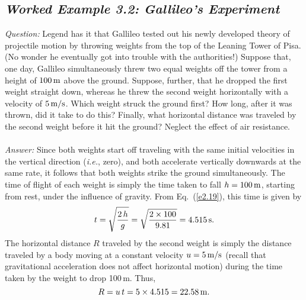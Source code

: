 \subsection*{\em Worked Example 3.2: Gallileo's Experiment}
{\em Question:} Legend has it that Gallileo tested out his newly developed
theory of projectile motion by throwing weights from the top of the
Leaning Tower of
Pisa. (No wonder he eventually got into trouble with the authorities!)
Suppose that, one day, Gallileo simultaneously threw two equal weights off the tower from
a height of $100\,{\rm m}$ above the ground. Suppose, further, that he
dropped the  first weight straight down,
whereas he threw the second weight horizontally with a velocity of $5\,{\rm m/s}$. 
Which weight  struck the ground first? How long, after it was thrown, did it take
to do this? Finally, what horizontal distance was traveled by the
second weight before it hit the ground? Neglect the effect of air
resistance.\\
~\\
{\em Answer:} Since both weights start off traveling with the same initial velocities in the
vertical direction ({\em i.e.}, zero), and both accelerate vertically downwards
at the same rate, it follows that both weights strike the ground simultaneously. 
The time of flight of each weight is simply the time taken to fall
$h=100\,{\rm m}$, starting from rest, under the influence of gravity. From
Eq.~(\ref{e2.19}), this time is given by
$$
t = \sqrt{\frac{2\,h}{g}} = \sqrt{\frac{2\times 100}{9.81}} = 4.515\,{\rm s}.
$$
The horizontal distance $R$ traveled by the second weight is simply the
distance traveled by a body moving at a constant velocity $u=5\,{\rm m/s}$
(recall that gravitational acceleration does not affect horizontal motion)
during the time taken by the weight to drop 100\,m. Thus,
$$
R = u\,t = 5\times 4.515 = 22.58\,{\rm m}.
$$

